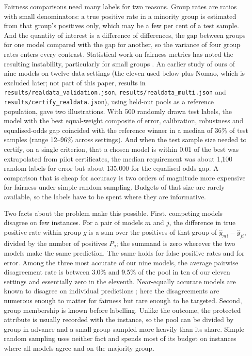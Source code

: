 \documentclass[pdflatex,sn-mathphys-num,iicol]{sn-jnl}
\theoremstyle{thmstyleone}
\theoremstyle{thmstyletwo}
\theoremstyle{thmstylethree}
\begin{document}
Fairness comparisons need many labels for two reasons. Group rates are ratios with small denominators: a true positive rate in a minority group is estimated from that group's positives only, which may be a few per cent of a test sample. And the quantity of interest is a difference of differences, the gap between groups for one model compared with the gap for another, so the variance of four group rates enters every contrast. Statistical work on fairness metrics has noted the resulting instability, particularly for small groups \citep{lum2022,ferrara2025}. An earlier study of ours of nine models on twelve data settings (the eleven used below plus Nomao, which is excluded later; not part of this paper, results in \texttt{results/realdata\_validation.json}, \texttt{results/realdata\_multi.json} and \texttt{results/certify\_realdata.json}), using held-out pools as a reference population, gave two illustrations. With 500 randomly drawn test labels, the model with the best equal-weight composite of error, calibration, robustness and equalised-odds gap coincided with the reference winner in a median of 36\% of test samples (range 12--96\% across settings). And when the test sample size needed to certify, on a single criterion, that a chosen model is within 0.01 of the best was extrapolated from pilot certificates, the median requirement was about 1,100 random labels for error but about 135,000 for the equalised-odds gap. A comparison that is cheap for accuracy is two orders of magnitude more expensive for fairness under simple random sampling. Budgets of that size are rarely available, so the labels have to be spent where they are informative.

Two facts about the problem make this possible. First, competing models disagree on few instances. For a pair of models $m$ and $j$, the difference in true positive rate within group $g$ is a sum over the positives of that group of $\hat y_{mi}-\hat y_{ji}$, divided by the number of positives $P_g$; the summand is zero wherever the two models make the same prediction. The same holds for false positive rates and for error. Among the three most accurate of our nine models, the average pairwise disagreement rate is between 3.0\% and 9.5\% of the pool in ten of our eleven settings and essentially zero in the eleventh. Near-equally accurate models are known to disagree on individual predictions \citep{marx2020}; here the disagreements are numerous enough to matter for fairness but rare enough to be targeted. Second, group membership is known before labelling. Unlike the outcome, the protected attribute is usually recorded with the instance, so the pool can be divided by group in advance and a small group sampled more heavily than its share. Simple random sampling uses neither fact and spends most of its budget on instances where all models agree and on the majority group.
\end{document}
